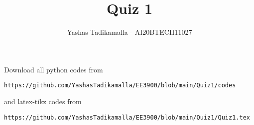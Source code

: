 \documentclass[journal,12pt,twocolumn]{IEEEtran}
\DeclareMathOperator*{\Res}{Res}
\begin{document}
\newcommand{\BEQA}{\begin{eqnarray}}
\newcommand{\EEQA}{\end{eqnarray}}
\newcommand{\define}{\stackrel{\triangle}{=}}

\raggedbottom
\setlength{\parindent}{0pt}
\providecommand{\mbf}{\mathbf}
\providecommand{\pr}[1]{\ensuremath{\Pr\left(#1\right)}}
\providecommand{\qfunc}[1]{\ensuremath{Q\left(#1\right)}}
\providecommand{\sbrak}[1]{\ensuremath{{}\left[#1\right]}}
\providecommand{\lsbrak}[1]{\ensuremath{{}\left[#1\right.}}
\providecommand{\rsbrak}[1]{\ensuremath{{}\left.#1\right]}}
\providecommand{\brak}[1]{\ensuremath{\left(#1\right)}}
\providecommand{\lbrak}[1]{\ensuremath{\left(#1\right.}}
\providecommand{\rbrak}[1]{\ensuremath{\left.#1\right)}}
\providecommand{\cbrak}[1]{\ensuremath{\left\{#1\right\}}}
\providecommand{\lcbrak}[1]{\ensuremath{\left\{#1\right.}}
\providecommand{\rcbrak}[1]{\ensuremath{\left.#1\right\}}}
\theoremstyle{remark}
\newtheorem{rem}{Remark}
\newtheorem*{remark}{Remark}
\newcommand{\sgn}{\mathop{\mathrm{sgn}}}
\providecommand{\abs}[1]{\vert#1\vert}
\providecommand{\res}[1]{\Res\displaylimits_{#1}} 
\providecommand{\norm}[1]{\lVert#1\rVert}
\providecommand{\mtx}[1]{\mathbf{#1}}
\providecommand{\mean}[1]{E[ #1 ]}
\providecommand{\fourier}{\overset{\mathcal{F}}{ \rightleftharpoons}}
\providecommand{\system}{\overset{\mathcal{H}}{ \longleftrightarrow}}
\newcommand{\solution}{\noindent \textbf{Solution: }}
\newcommand{\cosec}{\,\text{cosec}\,}
\providecommand{\dec}[2]{\ensuremath{\overset{#1}{\underset{#2}{\gtrless}}}}
\newcommand{\myvec}[1]{\ensuremath{\begin{pmatrix}#1\end{pmatrix}}}
\newcommand{\mydet}[1]{\ensuremath{\begin{vmatrix}#1\end{vmatrix}}}
\makeatletter
{}
\makeatother
\let\StandardTheFigure\thefigure
\let\vec\mathbf
\renewcommand{\thefigure}{\theproblem}
\def\putbox#1#2#3{\makebox[0in][l]{\makebox[#1][l]{}\raisebox{\baselineskip}[0in][0in]{\raisebox{#2}[0in][0in]{#3}}}}
     \def\rightbox#1{\makebox[0in][r]{#1}}
     \def\centbox#1{\makebox[0in]{#1}}
     \def\topbox#1{\raisebox{-\baselineskip}[0in][0in]{#1}}
     \def\midbox#1{\raisebox{-0.5\baselineskip}[0in][0in]{#1}}
\vspace{3cm}
\title{Quiz 1}
\author{Yashas Tadikamalla - AI20BTECH11027}
\maketitle
\newpage
\bigskip
\renewcommand{\thefigure}{\theenumi}
\renewcommand{\thetable}{\theenumi}
Download all python codes from 
\begin{lstlisting}
https://github.com/YashasTadikamalla/EE3900/blob/main/Quiz1/codes
\end{lstlisting}
%
and latex-tikz codes from 
%
\begin{lstlisting}
https://github.com/YashasTadikamalla/EE3900/blob/main/Quiz1/Quiz1.tex
\end{lstlisting}
\end{document}
